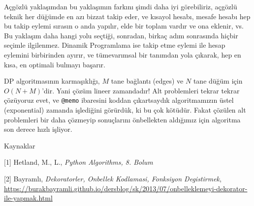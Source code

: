 \documentclass[12pt,fleqn]{article}\usepackage{../../common}
\begin{document}
Açgözlü yaklaşımdan bu yaklaşımın farkını şimdi daha iyi görebiliriz,
açgözlü teknik her düğümde en azı bizzat takip eder, ve kısayol hesabı,
mesafe hesabı hep bu takip eylemi sırasın o anda yapılır, elde bir toplam
vardır ve ona eklenir, vs. Bu yaklaşım daha hangi yolu seçtiği, sonradan,
birkaç adım sonrasında hiçbir seçimle ilgilenmez. Dinamik Programlama ise
takip etme eylemi ile hesap eylemini birbirinden ayırır, ve tümevarımsal
bir tanımdan yola çıkarak, hep en kısa, en optimali bulmayı başarır.

DP algoritmasının karmaşıklığı, $M$ tane bağlantı (edges) ve $N$ tane düğüm
için $O(N + M)$'dir. Yani çözüm lineer zamandadır! Alt problemleri tekrar
tekrar çözüyoruz evet, ve \verb!@memo! ibaresini koddan çıkartsaydık
algoritmamızın üstel (exponential) zamanda işlediğini görürdük, ki bu çok
kötüdür. Fakat çözülen alt problemleri bir daha çözmeyip sonuçlarını
önbellekten aldığımız için algoritma son derece hızlı işliyor.

Kaynaklar

[1] Hetland, M., L., {\em Python Algorithms, 8. Bolum}

[2] Bayramlı, {\em Dekoratorler, Onbellek Kodlamasi, Fonksiyon Degistirmek}, 
    \url{https://burakbayramli.github.io/dersblog/sk/2013/07/onbelleklemeyi-dekorator-ile-yapmak.html}
\end{document}
